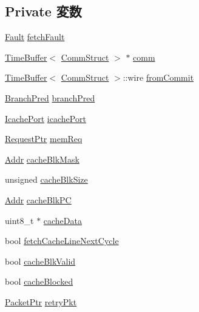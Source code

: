 \subsection*{Private 変数}
\begin{DoxyCompactItemize}
\item 
\hyperlink{classRefCountingPtr}{Fault} \hyperlink{classFrontEnd_ac2f4c2fc84b40d9abd220e8bd21242c9}{fetchFault}
\item 
\hyperlink{classTimeBuffer}{TimeBuffer}$<$ \hyperlink{classFrontEnd_ab99b68ad737741b1d3a073f2df88752a}{CommStruct} $>$ $\ast$ \hyperlink{classFrontEnd_a282f2307a986f183b83e887756561687}{comm}
\item 
\hyperlink{classTimeBuffer}{TimeBuffer}$<$ \hyperlink{classFrontEnd_ab99b68ad737741b1d3a073f2df88752a}{CommStruct} $>$::wire \hyperlink{classFrontEnd_a77bf6c956edddf1d551d5371ff72162e}{fromCommit}
\item 
\hyperlink{classFrontEnd_a25460b96f0b4cf1681e2c540a7a329eb}{BranchPred} \hyperlink{classFrontEnd_a98d9448d614ac60bbf861bbf3db21fa9}{branchPred}
\item 
\hyperlink{classFrontEnd_1_1IcachePort}{IcachePort} \hyperlink{classFrontEnd_a290723656a84b9cc90dfce377af9aad0}{icachePort}
\item 
\hyperlink{classRequest}{RequestPtr} \hyperlink{classFrontEnd_a5520eb2f7c2cf4b0e109d6ffd6d2d053}{memReq}
\item 
\hyperlink{base_2types_8hh_af1bb03d6a4ee096394a6749f0a169232}{Addr} \hyperlink{classFrontEnd_a33b99af01da30de3072e0fb714c0ca38}{cacheBlkMask}
\item 
unsigned \hyperlink{classFrontEnd_a7c9e97ff2bb74bc86262cd751490b482}{cacheBlkSize}
\item 
\hyperlink{base_2types_8hh_af1bb03d6a4ee096394a6749f0a169232}{Addr} \hyperlink{classFrontEnd_a5eccc8a239dec2935cc4a2c6aa5e3dd1}{cacheBlkPC}
\item 
uint8\_\-t $\ast$ \hyperlink{classFrontEnd_ab850d89c84ed3153a7e35592951cccd7}{cacheData}
\item 
bool \hyperlink{classFrontEnd_a2bc7884cb20b22f02a5454ca8b6205b6}{fetchCacheLineNextCycle}
\item 
bool \hyperlink{classFrontEnd_a80f6b4712235f03884c0447e594dd36c}{cacheBlkValid}
\item 
bool \hyperlink{classFrontEnd_a12a8dc8b9e94659a01ff979d9d98be89}{cacheBlocked}
\item 
\hyperlink{classPacket}{PacketPtr} \hyperlink{classFrontEnd_a314ae93c04b3ca96e79e1b1f39a8e478}{retryPkt}
\item 

\end{DoxyCompactItemize}
